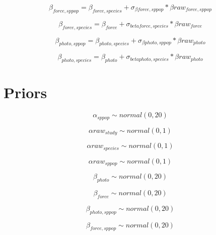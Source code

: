 \documentclass[11pt,letter]{article}
\begin{document}
\begin{equation}
\beta _{force,sppop} = \beta _{force,species} + \sigma_{\beta force,sppop} * \beta raw_{force,sppop}
\end{equation}

\begin{equation}
\beta _{force,species} = \beta_{force} + \sigma_{beta force, species} * \beta raw_{force}
\end{equation}

\begin{equation}
\beta _{photo,sppop} = \beta_{photo, species} + \sigma_{\beta photo,sppop} * \beta raw_{photo}
\end{equation}

\begin{equation}
\beta_{photo,species}  = \beta_{photo} + \sigma_{beta photo, species} * \beta raw_{photo}
\end{equation}


\section{Priors}

\begin{equation}
\alpha_{sppop}  \sim normal(0,20)
\end{equation}

\begin{equation}
\alpha raw _{study} \sim normal(0,1)
\end{equation}

\begin{equation}
\alpha raw _{species}\sim normal(0,1)
\end{equation}

\begin{equation}
\alpha raw _{sppop}\sim normal(0,1)
\end{equation}

\begin{equation}
\beta_{photo}  \sim normal(0,20)
\end{equation}

\begin{equation}
\beta_{force}  \sim normal(0,20)
\end{equation}

\begin{equation}
\beta_{photo, sppop}  \sim normal(0,20)
\end{equation}

\begin{equation}
\beta_{force, sppop}  \sim normal(0,20)
\end{equation}
\end{document}
